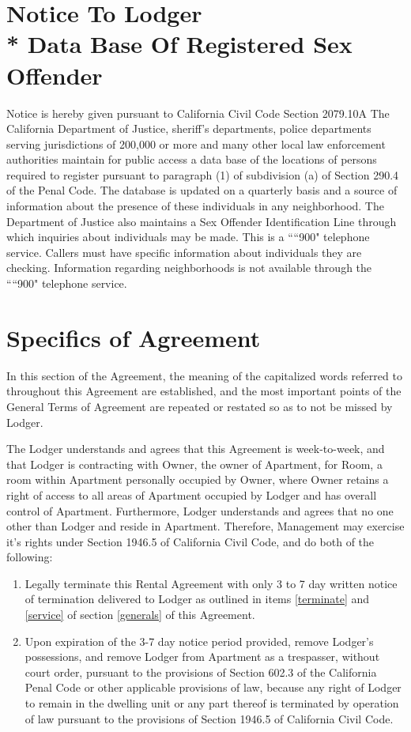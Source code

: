 \documentclass[12pt,letterpaper]{article}
\newcommand{\lodger}{Lodger}
\newcommand{\generals}{General Terms of Agreement}
\newcommand{\notice}{Notice To \lodger{}\\* Data Base Of Registered Sex Offender}
\newcommand{\specifics}{Specifics of Agreement}
\newcommand{\management}{Management}
\newcommand{\apt}{Apartment}
\newcommand{\room}{Room}
\begin{document}
\newpage
\section{\notice{}} \label{notice}

Notice is hereby given pursuant to California Civil Code Section 2079.10A The California Department of Justice, sheriff's departments, police departments serving jurisdictions of 200,000 or more and many other local law enforcement authorities maintain for public access a data base of the locations of persons required to register pursuant to paragraph (1) of subdivision (a) of Section 290.4 of the Penal Code. The database is updated on a quarterly basis and a source of information about the presence of these individuals in any neighborhood. The Department of Justice also maintains a Sex Offender Identification Line through which inquiries about individuals may be made. This is a ````900" telephone service. Callers must have specific information about individuals they are checking. Information regarding neighborhoods is not available through the ````900" telephone service. 

\newpage
\section{\specifics{}} \label{specifics}
In this section of the Agreement, the meaning of the capitalized words referred to throughout this Agreement are established, and the most important points of the \generals{} are repeated or restated so as to not be missed by \lodger{}.

The \lodger{} understands and agrees that this Agreement is week-to-week, and that \lodger{} is contracting with Owner, the owner of \apt{}, for \room{}, a room within \apt{} personally occupied by Owner, where Owner retains a right of access to all areas of \apt{} occupied by \lodger{} and has overall control of \apt{}. Furthermore, \lodger{} understands and agrees that no one other than \lodger{} and \owner{} reside in \apt{}. Therefore, \management{} may exercise it's rights under Section 1946.5 of California Civil Code, and do both of the following: 
\begin{enumerate}
	\item Legally terminate this Rental Agreement with only 3 to 7 day written notice of termination delivered to \lodger{} as outlined in items \ref{terminate} and \ref{service} of section \ref{generals} of this Agreement.
	\item Upon expiration of the 3-7 day notice period provided, remove \lodger{}'s possessions, and remove \lodger{} from \apt{} as a trespasser, without court order, pursuant to the provisions of Section 602.3 of the California Penal Code or other applicable provisions of law, because any right of \lodger{} to remain in the dwelling unit or any part thereof is terminated by operation of law pursuant to the provisions of Section 1946.5 of California Civil Code.
\end{enumerate}
\end{document}
